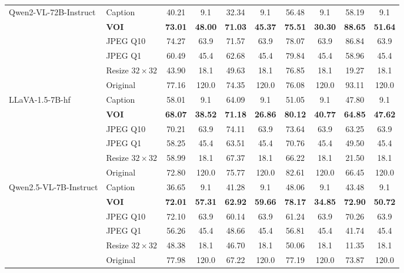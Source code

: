 \begin{table}[p]
{\begin{tabular}{llcccccccc}
\multirow{6}{*}{Qwen2-VL-72B-Instruct}
& Caption & 40.21 & 9.1 & 32.34 & 9.1 & 56.48 & 9.1 & 58.19 & 9.1 \\
& \textbf{VOI} & \textbf{73.01} & \textbf{48.00} & \textbf{71.03} & \textbf{45.37} & \textbf{75.51} & \textbf{30.30} & \textbf{88.65} & \textbf{51.64} \\
& JPEG Q10 & 74.27 & 63.9 & 71.57 & 63.9 & 78.07 & 63.9 & 86.84 & 63.9 \\
& JPEG Q1 & 60.49 & 45.4 & 62.68 & 45.4 & 79.84 & 45.4 & 58.96 & 45.4 \\
& Resize $32{\times}32$ & 43.90 & 18.1 & 49.63 & 18.1 & 76.85 & 18.1 & 19.27 & 18.1 \\
& Original & 77.16 & 120.0 & 74.35 & 120.0 & 76.08 & 120.0 & 93.11 & 120.0 \\
\midrule

\multirow{6}{*}{LLaVA-1.5-7B-hf}
& Caption & 58.01 & 9.1 & 64.09 & 9.1 & 51.05 & 9.1 & 47.80 & 9.1 \\
& \textbf{VOI} & \textbf{68.07} & \textbf{38.52} & \textbf{71.18} & \textbf{26.86} & \textbf{80.12} & \textbf{40.77} & \textbf{64.85} & \textbf{47.62} \\
& JPEG Q10 & 70.21 & 63.9 & 74.11 & 63.9 & 73.64 & 63.9 & 63.25 & 63.9 \\
& JPEG Q1 & 58.25 & 45.4 & 63.51 & 45.4 & 70.76 & 45.4 & 49.50 & 45.4 \\
& Resize $32{\times}32$ & 58.99 & 18.1 & 67.37 & 18.1 & 66.22 & 18.1 & 21.50 & 18.1 \\
& Original & 72.80 & 120.0 & 75.77 & 120.0 & 82.61 & 120.0 & 66.45 & 120.0 \\
\midrule

\multirow{6}{*}{Qwen2.5-VL-7B-Instruct}
& Caption & 36.65 & 9.1 & 41.28 & 9.1 & 48.06 & 9.1 & 43.48 & 9.1 \\
& \textbf{VOI} & \textbf{72.01} & \textbf{57.31} & \textbf{62.92} & \textbf{59.66} & \textbf{78.17} & \textbf{34.85} & \textbf{72.90} & \textbf{50.72} \\
& JPEG Q10 & 72.10 & 63.9 & 60.14 & 63.9 & 61.24 & 63.9 & 70.26 & 63.9 \\
& JPEG Q1 & 56.26 & 45.4 & 48.66 & 45.4 & 56.81 & 45.4 & 41.74 & 45.4 \\
& Resize $32{\times}32$ & 48.38 & 18.1 & 46.70 & 18.1 & 50.06 & 18.1 & 11.35 & 18.1 \\
& Original & 77.98 & 120.0 & 67.22 & 120.0 & 77.19 & 120.0 & 73.87 & 120.0 \\
\midrule


\end{tabular}}
\end{table}

